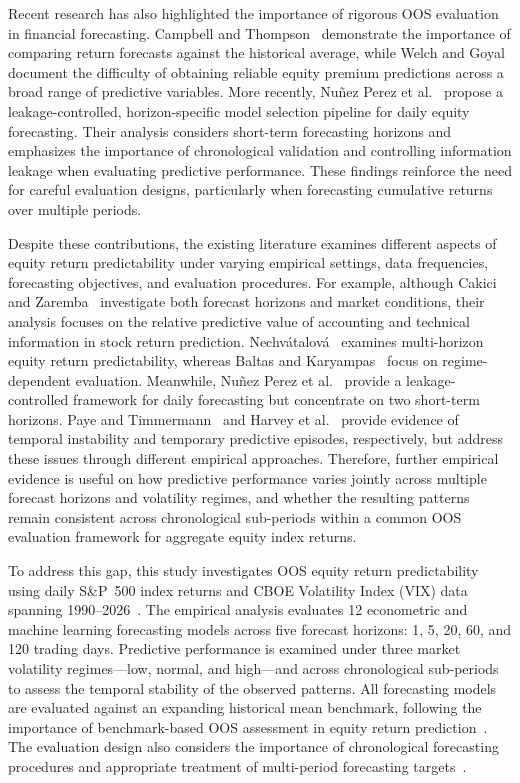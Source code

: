\documentclass[12pt,twoside]{ord}
\begin{document}
Recent research has also highlighted the importance of rigorous OOS evaluation in financial forecasting. Campbell and Thompson~\cite{campbell2008} demonstrate the importance of comparing return forecasts against the historical average, while Welch and Goyal~\cite{welch2008} document the difficulty of obtaining reliable equity premium predictions across a broad range of predictive variables. More recently, Nu\~nez Perez et al.~\cite{perez2026} propose a leakage-controlled, horizon-specific model selection pipeline for daily equity forecasting. Their analysis considers short-term forecasting horizons and emphasizes the importance of chronological validation and controlling information leakage when evaluating predictive performance. These findings reinforce the need for careful evaluation designs, particularly when forecasting cumulative returns over multiple periods.

Despite these contributions, the existing literature examines different aspects of equity return predictability under varying empirical settings, data frequencies, forecasting objectives, and evaluation procedures. For example, although Cakici and Zaremba~\cite{cakici2025} investigate both forecast horizons and market conditions, their analysis focuses on the relative predictive value of accounting and technical information in stock return prediction. Nechv{\'a}talov{\'a}~\cite{nechvatalova2024} examines multi-horizon equity return predictability, whereas Baltas and Karyampas~\cite{baltas2018} focus on regime-dependent evaluation. Meanwhile, Nu\~nez Perez et al.~\cite{perez2026} provide a leakage-controlled framework for daily forecasting but concentrate on two short-term horizons. Paye and Timmermann~\cite{paye2006} and Harvey et al.~\cite{harvey2021} provide evidence of temporal instability and temporary predictive episodes, respectively, but address these issues through different empirical approaches. Therefore, further empirical evidence is useful on how predictive performance varies jointly across multiple forecast horizons and volatility regimes, and whether the resulting patterns remain consistent across chronological sub-periods within a common OOS evaluation framework for aggregate equity index returns.

To address this gap, this study investigates OOS equity return predictability using daily S\&P~500 index returns and CBOE Volatility Index (VIX) data spanning 1990--2026~\cite{fredvix,yahoosandp}. The empirical analysis evaluates 12 econometric and machine learning forecasting models across five forecast horizons: 1, 5, 20, 60, and 120 trading days. Predictive performance is examined under three market volatility regimes---low, normal, and high---and across chronological sub-periods to assess the temporal stability of the observed patterns. All forecasting models are evaluated against an expanding historical mean benchmark, following the importance of benchmark-based OOS assessment in equity return prediction~\cite{campbell2008}. The evaluation design also considers the importance of chronological forecasting procedures and appropriate treatment of multi-period forecasting targets~\cite{hewamalage2023,tashman2000}.
\end{document}
